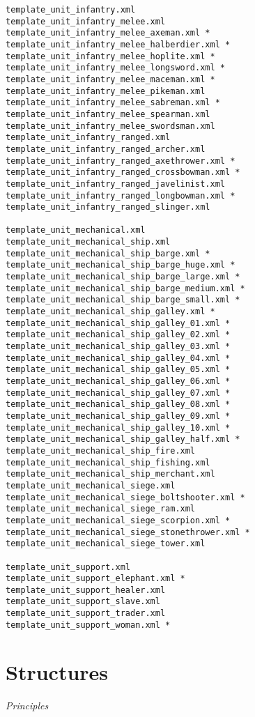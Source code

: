 \documentclass{article}
\begin{document}
\begin{multicols}{2}
{\begin{verbatim}
template_unit_infantry.xml
template_unit_infantry_melee.xml
template_unit_infantry_melee_axeman.xml *
template_unit_infantry_melee_halberdier.xml *
template_unit_infantry_melee_hoplite.xml *
template_unit_infantry_melee_longsword.xml *
template_unit_infantry_melee_maceman.xml *
template_unit_infantry_melee_pikeman.xml
template_unit_infantry_melee_sabreman.xml *
template_unit_infantry_melee_spearman.xml
template_unit_infantry_melee_swordsman.xml
template_unit_infantry_ranged.xml
template_unit_infantry_ranged_archer.xml
template_unit_infantry_ranged_axethrower.xml *
template_unit_infantry_ranged_crossbowman.xml *
template_unit_infantry_ranged_javelinist.xml
template_unit_infantry_ranged_longbowman.xml *
template_unit_infantry_ranged_slinger.xml

template_unit_mechanical.xml
template_unit_mechanical_ship.xml
template_unit_mechanical_ship_barge.xml *
template_unit_mechanical_ship_barge_huge.xml *
template_unit_mechanical_ship_barge_large.xml *
template_unit_mechanical_ship_barge_medium.xml *
template_unit_mechanical_ship_barge_small.xml *
template_unit_mechanical_ship_galley.xml *
template_unit_mechanical_ship_galley_01.xml *
template_unit_mechanical_ship_galley_02.xml *
template_unit_mechanical_ship_galley_03.xml *
template_unit_mechanical_ship_galley_04.xml *
template_unit_mechanical_ship_galley_05.xml *
template_unit_mechanical_ship_galley_06.xml *
template_unit_mechanical_ship_galley_07.xml *
template_unit_mechanical_ship_galley_08.xml *
template_unit_mechanical_ship_galley_09.xml *
template_unit_mechanical_ship_galley_10.xml *
template_unit_mechanical_ship_galley_half.xml *
template_unit_mechanical_ship_fire.xml
template_unit_mechanical_ship_fishing.xml
template_unit_mechanical_ship_merchant.xml
template_unit_mechanical_siege.xml
template_unit_mechanical_siege_boltshooter.xml *
template_unit_mechanical_siege_ram.xml
template_unit_mechanical_siege_scorpion.xml *
template_unit_mechanical_siege_stonethrower.xml *
template_unit_mechanical_siege_tower.xml

template_unit_support.xml
template_unit_support_elephant.xml *
template_unit_support_healer.xml
template_unit_support_slave.xml
template_unit_support_trader.xml
template_unit_support_woman.xml *
\end{verbatim}
}
\end{multicols}



\clearpage
\section{Structures}
\textit{Principles}
\end{document}
